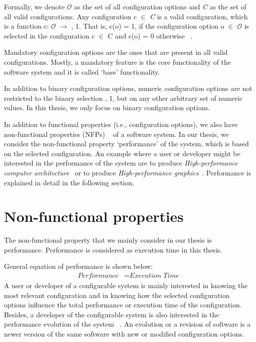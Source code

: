 Formally, we denote $\mathcal{O}$ as the set of all configuration options and \textit{C} as the set of all valid configurations. Any configuration c $\in$ \textit{C} is a valid configuration, which is a function c: $\mathcal{O}$ $\rightarrow$ , 1\textbraceright. That is, c(o) = 1, if the configuration option o $\in$  $\mathcal{O}$ is selected in the configuration c $\in$ C and c(o) = 0 otherwise  ~\cite{DBLP:conf/sigsoft/SiegmundGAK15}.

Mandatory configuration options are the ones that are present in all valid configurations. Mostly, a mandatory feature is the core functionality of the software system and it is called \enquote*{base} functionality.

In addition to binary configuration options, numeric configuration options are not restricted to the binary selection , 1\textbraceright, but on any other arbitrary set of numeric values. In this thesis, we only focus on binary configuration options.

In addition to functional properties (i.e., configuration options), we also have non-functional properties (NFPs) ~\cite{DBLP:conf/icse/SiegmundKKABRS12} of a software system. In our thesis, we consider the non-functional property \enquote*{performance} of the system, which is based on the selected configuration. An example where a user or developer might be interested in the performance of the system are to produce \textit{High-performance computer architecture}~\cite{DBLP:journals/tog/KenzelKSS18} or to produce \textit{High-performance graphics}~\cite{DBLP:conf/ppopp/AwadAJFO19}. Performance is explained in detail in the following section.


\section{Non-functional properties}
\label{sec:2.2}
The non-functional property that we mainly consider in our thesis is performance. Performance is considered as execution time in this thesis. 

General equation of performance is shown below:
\begin{align*}
 {\textit{Performance}} &= {\textit{Execution Time}}
\end{align*}
A user or developer of a configurable system is mainly interested in knowing the most relevant configuration and in knowing how the selected configuration options influence the total performance or execution time of the configuration. Besides, a developer of the configurable system is also interested in the performance evolution of the system ~\cite{DBLP:conf/pldi/JinSSSL12}. An evolution or a revision of software is a newer version of the same software with new or modified configuration options.

